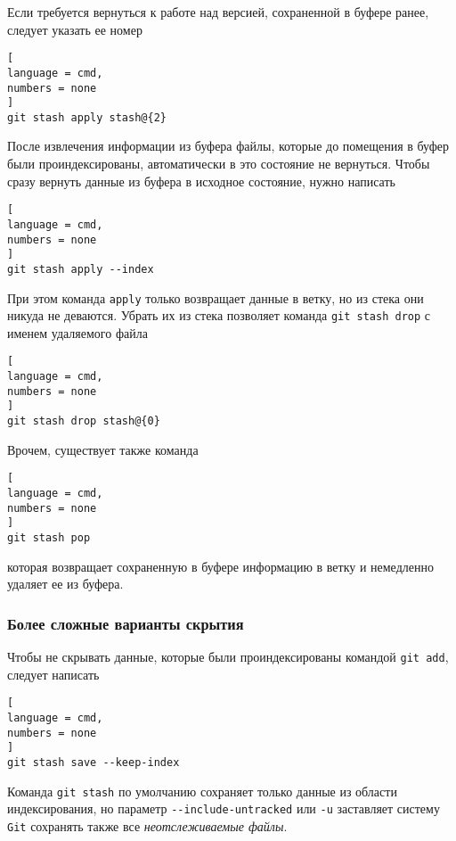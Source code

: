 \documentclass[%
	11pt,
	a4paper,
	utf8,
		]{article}
\begin{document}
Если требуется вернуться к работе над версией, сохраненной в буфере ранее, следует указать ее номер

\begin{lstlisting}[
language = cmd,
numbers = none
]
git stash apply stash@{2}
\end{lstlisting}


После извлечения информации из буфера файлы, которые до помещения в буфер были проиндексированы, автоматически в это состояние не вернуться. Чтобы сразу вернуть данные из буфера в исходное состояние, нужно написать

\begin{lstlisting}[
language = cmd,
numbers = none
]
git stash apply --index
\end{lstlisting}

При этом команда \texttt{apply} только возвращает данные в ветку, но из стека они никуда не деваются. Убрать их из стека позволяет команда \texttt{git stash drop} с именем удаляемого файла

\begin{lstlisting}[
language = cmd,
numbers = none
]
git stash drop stash@{0}
\end{lstlisting}


Врочем, существует также команда
\begin{lstlisting}[
language = cmd,
numbers = none
]
git stash pop
\end{lstlisting}
которая возвращает сохраненную в буфере информацию в ветку и немедленно удаляет ее из буфера.

\subsubsection{Более сложные варианты скрытия}

Чтобы не скрывать данные, которые были проиндексированы командой \texttt{git add}, следует написать

\begin{lstlisting}[
language = cmd,
numbers = none
]
git stash save --keep-index
\end{lstlisting}

Команда \texttt{git stash} по умолчанию сохраняет только данные из области индексирования, но параметр \lstinline{--include-untracked} или \lstinline{-u} заставляет систему \texttt{Git} сохранять также все \emph{неотслеживаемые файлы}.
\end{document}
